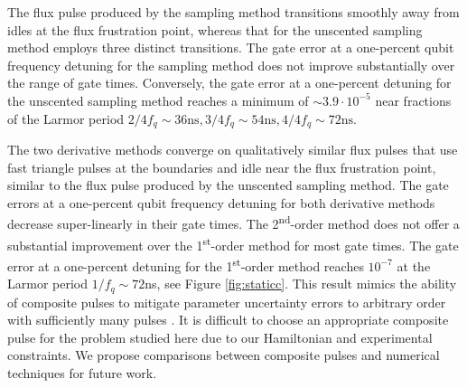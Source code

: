 The flux pulse produced by the sampling method
transitions  smoothly away from idles at the flux frustration point,
whereas that for the unscented sampling method employs
three distinct transitions.
The gate error at a one-percent qubit frequency detuning for the sampling method
does not improve substantially over the
range of gate times. Conversely, the gate error at a one-percent detuning
for the unscented sampling method reaches a minimum of $\sim 3.9 \cdot 10^{-5}$
near fractions of the Larmor period $2/4f_{q} \sim 36\textrm{ns},
3/4f_{q} \sim 54\textrm{ns}, 4/4f_{q} \sim 72\textrm{ns}$.

The two derivative methods converge on qualitatively similar flux pulses that
use fast triangle pulses at the boundaries and idle near the flux frustration point,
similar to the flux pulse produced by the unscented sampling method.
The gate errors at a one-percent qubit frequency detuning
for both derivative methods decrease super-linearly in their gate times.
The 2\textsuperscript{nd}-order method does not offer a substantial improvement
over the 1\textsuperscript{st}-order method for most gate times.
The gate error at a one-percent detuning for the 1\textsuperscript{st}-order
method reaches $10^{-7}$ at the Larmor period $1 / f_{q} \sim 72$ns,
see Figure \ref{fig:staticc}.
This result mimics the
ability of composite pulses to mitigate parameter uncertainty errors to arbitrary
order with sufficiently many pulses \cite{merrill2014progress}.
It is difficult to choose an appropriate composite pulse
for the problem studied here due to our Hamiltonian and experimental constraints.
We propose comparisons between composite pulses and numerical techniques
for future work.

